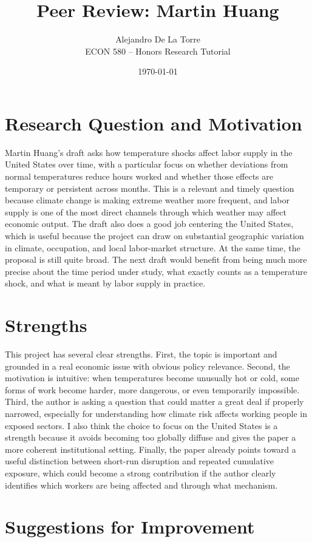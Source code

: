 \documentclass[12pt]{article}
\title{Peer Review: Martin Huang}
\author{Alejandro De La Torre \\
ECON 580 -- Honors Research Tutorial}
\date{\today}
\begin{document}
\maketitle

\section{Research Question and Motivation}

Martin Huang’s draft asks how temperature shocks affect labor supply in the United States over time, with a particular focus on whether deviations from normal temperatures reduce hours worked and whether those effects are temporary or persistent across months. This is a relevant and timely question because climate change is making extreme weather more frequent, and labor supply is one of the most direct channels through which weather may affect economic output. The draft also does a good job centering the United States, which is useful because the project can draw on substantial geographic variation in climate, occupation, and local labor-market structure. At the same time, the proposal is still quite broad. The next draft would benefit from being much more precise about the time period under study, what exactly counts as a temperature shock, and what is meant by labor supply in practice.


\section{Strengths}

This project has several clear strengths. First, the topic is important and grounded in a real economic issue with obvious policy relevance. Second, the motivation is intuitive: when temperatures become unusually hot or cold, some forms of work become harder, more dangerous, or even temporarily impossible. Third, the author is asking a question that could matter a great deal if properly narrowed, especially for understanding how climate risk affects working people in exposed sectors. I also think the choice to focus on the United States is a strength because it avoids becoming too globally diffuse and gives the paper a more coherent institutional setting. Finally, the paper already points toward a useful distinction between short-run disruption and repeated cumulative exposure, which could become a strong contribution if the author clearly identifies which workers are being affected and through what mechanism.


\section{Suggestions for Improvement}
\end{document}
